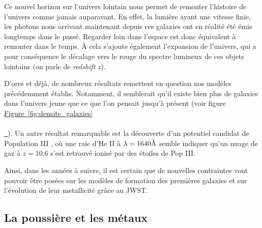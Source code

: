 \documentclass[12pt, a4paper]{article}
\newcommand*{\figref}[2][]{%
  \hyperref[{#2}]{%
    Figure~\ref*{#2}%
    \ifx\\#1\\%
    \else
      \,#1%
    \fi
  }%
}
\begin{document}
Ce nouvel horizon sur l'univers lointain nous permet de remonter l'histoire de l'univers comme jamais auparavant. En effet, la lumière ayant une vitesse finie, les photons nous arrivant maintenant depuis ces galaxies ont en réalité été émis longtemps dans le passé. Regarder loin dans l'espace est donc équivalent à remonter dans le temps. À cela s'ajoute également l'expansion de l'univers, qui a pour conséquence le décalage vers le rouge du spectre lumineux de ces objets lointains (on parle de \textit{redshift} $z$).

D'ores et déjà, de nombreux résultats remettent en question nos modèles précédemment établis. Notamment, il semblerait qu'il existe bien plus de galaxies dans l'univers jeune que ce que l'on pensait jusqu'à présent \parencite{2023arXiv231104279F} (voir figure \figref{fig:densite_galaxies}). Un autre résultat remarquable est la découverte d'un potentiel candidat de Population III \parencite{2023arXiv230600953M}, où une raie d'He II à $\lambda = 1640 \text{\r{A}}$ semble indiquer qu'un nuage de gaz à $z = 10.6$ s'est retrouvé ionisé par des étoiles de Pop III. 

Ainsi, dans les années à suivre, il est certain que de nouvelles contraintes vont pouvoir être posées sur les modèles de formation des premières galaxies et sur l'évolution de leur metallicité grâce au JWST.

\subsection{La poussière et les métaux}
\end{document}
